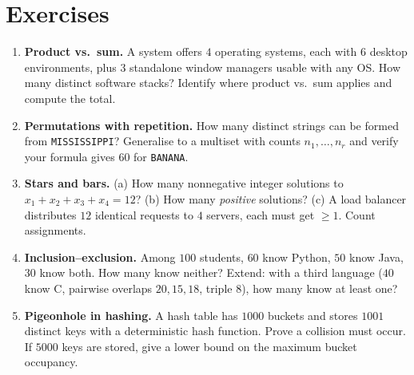\section{Exercises}
\label{sec:ch01-exercises}
\begin{enumerate}[label=E1.\arabic*, leftmargin=*, itemsep=0.8em]
\item \textbf{Product vs.\ sum.} A system offers $4$ operating systems, each with $6$ desktop environments, plus $3$ standalone window managers usable with any OS. How many distinct software stacks? Identify where product vs.\ sum applies and compute the total.
\item \textbf{Permutations with repetition.} How many distinct strings can be formed from \texttt{MISSISSIPPI}? Generalise to a multiset with counts $n_1,\dots,n_r$ and verify your formula gives $60$ for \texttt{BANANA}.
\item \textbf{Stars and bars.} (a) How many nonnegative integer solutions to $x_1+x_2+x_3+x_4=12$? (b) How many \emph{positive} solutions? (c) A load balancer distributes $12$ identical requests to $4$ servers, each must get $\ge1$. Count assignments.
\item \textbf{Inclusion--exclusion.} Among $100$ students, $60$ know Python, $50$ know Java, $30$ know both. How many know neither? Extend: with a third language ($40$ know C, pairwise overlaps $20,15,18$, triple $8$), how many know at least one?
\item \textbf{Pigeonhole in hashing.} A hash table has $1000$ buckets and stores $1001$ distinct keys with a deterministic hash function. Prove a collision must occur. If $5000$ keys are stored, give a lower bound on the maximum bucket occupancy.
\end{enumerate}

